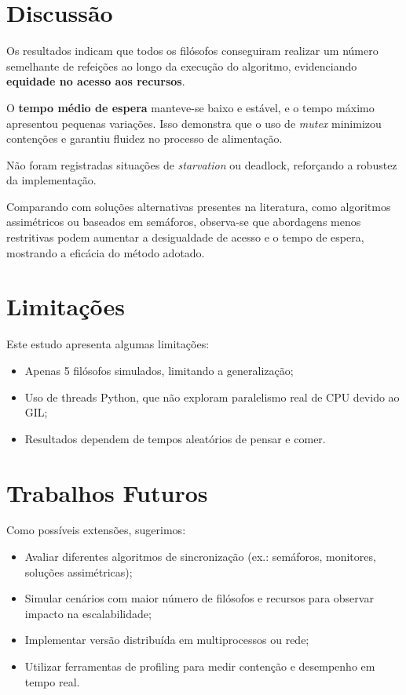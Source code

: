 \documentclass[12pt,a4paper]{article}
\begin{document}
\section{Discussão}
Os resultados indicam que todos os filósofos conseguiram realizar um número semelhante de refeições ao longo da execução do algoritmo, evidenciando \textbf{equidade no acesso aos recursos}.  

O \textbf{tempo médio de espera} manteve-se baixo e estável, e o tempo máximo apresentou pequenas variações. Isso demonstra que o uso de \textit{mutex} minimizou contenções e garantiu fluidez no processo de alimentação.  

Não foram registradas situações de \textit{starvation} ou deadlock, reforçando a robustez da implementação.  

Comparando com soluções alternativas presentes na literatura, como algoritmos assimétricos ou baseados em semáforos, observa-se que abordagens menos restritivas podem aumentar a desigualdade de acesso e o tempo de espera, mostrando a eficácia do método adotado.

\section{Limitações}
Este estudo apresenta algumas limitações:

\begin{itemize}
    \item Apenas 5 filósofos simulados, limitando a generalização;
    \item Uso de threads Python, que não exploram paralelismo real de CPU devido ao GIL;
    \item Resultados dependem de tempos aleatórios de pensar e comer.
\end{itemize}

\section{Trabalhos Futuros}
Como possíveis extensões, sugerimos:

\begin{itemize}
    \item Avaliar diferentes algoritmos de sincronização (ex.: semáforos, monitores, soluções assimétricas);
    \item Simular cenários com maior número de filósofos e recursos para observar impacto na escalabilidade;
    \item Implementar versão distribuída em multiprocessos ou rede;
    \item Utilizar ferramentas de profiling para medir contenção e desempenho em tempo real.
\end{itemize}
\end{document}

